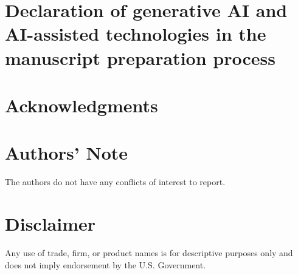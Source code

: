 \documentclass[preprint,authoryear,11pt]{elsarticle}
\begin{document}
\section*{Declaration of generative AI and AI-assisted technologies in the manuscript preparation process}


\section*{Acknowledgments}


\section*{Authors' Note}

The authors do not have any conflicts of interest to report.

\section*{Disclaimer}

Any use of trade, firm, or product names is for descriptive purposes only and does not imply endorsement by the U.S. Government.



\end{document}

